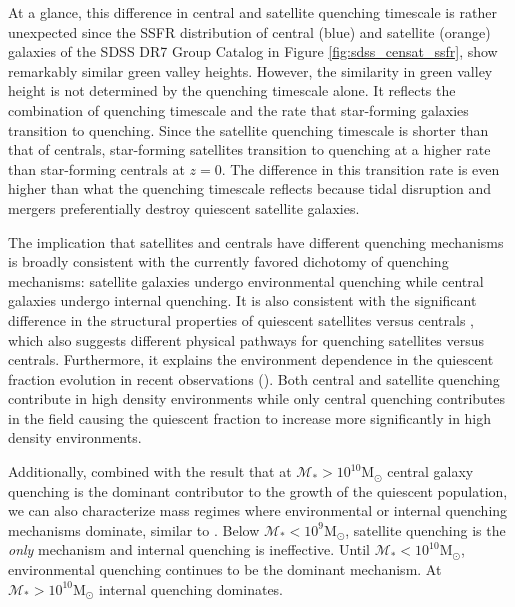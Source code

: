 \documentclass[iop,apj,tighten,twocolappendix,numberedappendix]{emulateapj}
\begin{document}
At a glance, this difference in central and satellite quenching 
timescale is rather unexpected since the SSFR distribution of
central (blue) and satellite (orange) galaxies of the SDSS DR7 
Group Catalog in Figure \ref{fig:sdss_censat_ssfr}, show remarkably 
similar green valley heights.  
However, the similarity in green valley height is not determined 
by the quenching timescale alone. It reflects the combination 
of quenching timescale and the rate that star-forming galaxies 
transition to quenching. Since the satellite quenching timescale
is shorter than that of centrals, star-forming satellites 
transition to quenching at a higher rate than star-forming 
centrals at $z = 0$. The difference in this transition rate is
even higher than what the quenching timescale reflects because 
tidal disruption and mergers preferentially destroy quiescent 
satellite galaxies.  

The implication that satellites and centrals have different quenching 
mechanisms is broadly consistent with the currently favored dichotomy of 
quenching mechanisms: satellite galaxies undergo environmental 
quenching while central galaxies undergo internal quenching. 
It is also consistent with the significant difference in the structural 
properties of quiescent satellites versus centrals \citep{Woo:2016aa}, 
which also suggests different physical pathways for quenching
satellites versus centrals.
Furthermore, it explains the environment dependence in the quiescent fraction 
evolution in recent observations (\citealt{Hahn:2015aa, Darvish:2016aa}). 
Both central and satellite quenching contribute in high density 
environments while only central quenching contributes in the field 
causing the quiescent fraction to increase more significantly in high
density environments. 

Additionally, combined with the \cite{Wetzel:2013aa} 
result that at $\mathcal{M}_* > 10^{10} \mathrm{M}_\odot$ central 
galaxy quenching is the dominant contributor to the growth of the 
quiescent population, we can also characterize mass regimes where 
environmental or internal quenching mechanisms dominate, similar to 
\cite{Peng:2010aa}. 
Below $\mathcal{M}_* < 10^{9} \mathrm{M}_\odot$, satellite quenching 
is the {\em only} mechanism \citep{Geha:2012aa} and internal quenching 
is ineffective. Until $\mathcal{M}_* < 10^{10} \mathrm{M}_\odot$, 
environmental quenching continues to be the dominant mechanism. At 
$\mathcal{M}_* > 10^{10} \mathrm{M}_\odot$ internal quenching 
dominates.
\end{document}
